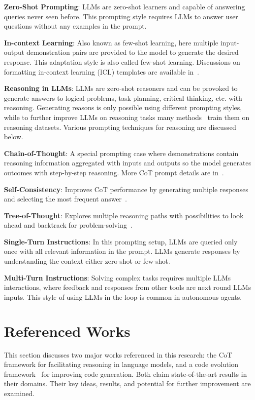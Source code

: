 \documentclass[a4paper,oneside]{book}
\begin{document}
\textbf{Zero-Shot Prompting}: LLMs are zero-shot learners and capable of answering queries never seen before. This prompting style requires LLMs to answer user questions without any examples in the prompt.

\textbf{In-context Learning}: Also known as few-shot learning, here multiple input-output demonstration pairs are provided to the model to generate the desired response. This adaptation style is also called few-shot learning. Discussions on formatting in-context learning (ICL) templates are available in~\cite{dong2022survey, zhao2023survey, wang2022super, chung2022scaling}.

\textbf{Reasoning in LLMs}: LLMs are zero-shot reasoners and can be provoked to generate answers to logical problems, task planning, critical thinking, etc. with reasoning. Generating reasons is only possible using different prompting styles, while to further improve LLMs on reasoning tasks many methods~\cite{chung2022scaling, iyer2022opt} train them on reasoning datasets. Various prompting techniques for reasoning are discussed below.

\textbf{Chain-of-Thought}: A special prompting case where demonstrations contain reasoning information aggregated with inputs and outputs so the model generates outcomes with step-by-step reasoning. More CoT prompt details are in~\cite{huang2022towards, wei2022chain, kim2023cot}.

\textbf{Self-Consistency}: Improves CoT performance by generating multiple responses and selecting the most frequent answer~\cite{wang2022self}.

\textbf{Tree-of-Thought}: Explores multiple reasoning paths with possibilities to look ahead and backtrack for problem-solving~\cite{yao2023tree}.

\textbf{Single-Turn Instructions}: In this prompting setup, LLMs are queried only once with all relevant information in the prompt. LLMs generate responses by understanding the context either zero-shot or few-shot.

\textbf{Multi-Turn Instructions}: Solving complex tasks requires multiple LLMs interactions, where feedback and responses from other tools are next round LLMs inputs. This style of using LLMs in the loop is common in autonomous agents.

\chapter{Referenced Works}
This section discusses two major works referenced in this research: the CoT framework for facilitating reasoning in language models, and a code evolution framework~\cite{jiang2023selfevolve} for improving code generation. Both claim state-of-the-art results in their domains. Their key ideas, results, and potential for further improvement are examined.
\end{document}
